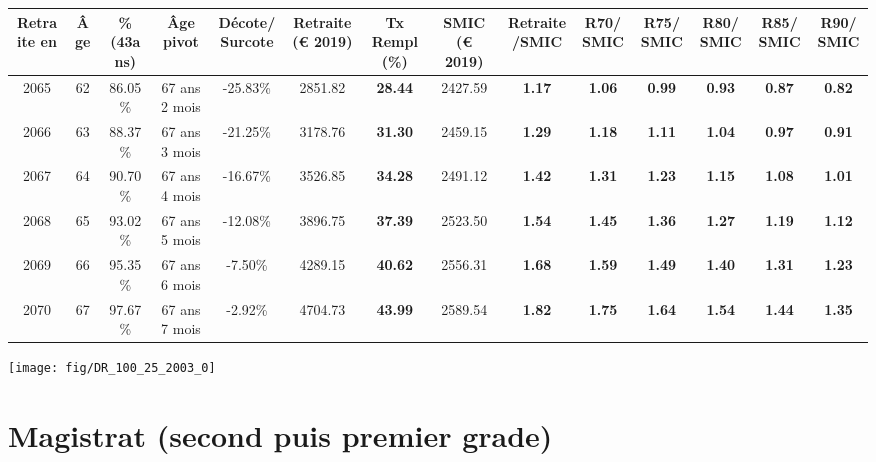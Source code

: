 \begin{adjustbox}{max width=\textwidth} 
\begin{tabular}[htb]{|c|c||c|c|c||c|c||c|c||c|c|c|c|c|} 
\hline 
 Retraite en &  Âge &  \%(43ans) &  Âge pivot &  Décote/Surcote &  Retraite (\euro{} 2019) &  Tx Rempl(\%) &  SMIC (\euro{} 2019) &  Retraite/SMIC &  R70/SMIC &  R75/SMIC &  R80/SMIC &  R85/SMIC &  R90/SMIC \\ 
\hline \hline 
 2065 &  62 &  86.05\% &  67 ans 2 mois &  -25.83\% &  2851.82 &  {\bf 28.44} &  2427.59 &  {\bf 1.17} &  {\bf 1.06} &  {\bf {\color{red} 0.99}} &  {\bf {\color{red} 0.93}} &  {\bf {\color{red} 0.87}} &  {\bf {\color{red} 0.82}} \\ 
\hline 
 2066 &  63 &  88.37\% &  67 ans 3 mois &  -21.25\% &  3178.76 &  {\bf 31.30} &  2459.15 &  {\bf 1.29} &  {\bf 1.18} &  {\bf 1.11} &  {\bf 1.04} &  {\bf {\color{red} 0.97}} &  {\bf {\color{red} 0.91}} \\ 
\hline 
 2067 &  64 &  90.70\% &  67 ans 4 mois &  -16.67\% &  3526.85 &  {\bf 34.28} &  2491.12 &  {\bf 1.42} &  {\bf 1.31} &  {\bf 1.23} &  {\bf 1.15} &  {\bf 1.08} &  {\bf 1.01} \\ 
\hline 
 2068 &  65 &  93.02\% &  67 ans 5 mois &  -12.08\% &  3896.75 &  {\bf 37.39} &  2523.50 &  {\bf 1.54} &  {\bf 1.45} &  {\bf 1.36} &  {\bf 1.27} &  {\bf 1.19} &  {\bf 1.12} \\ 
\hline 
 2069 &  66 &  95.35\% &  67 ans 6 mois &  -7.50\% &  4289.15 &  {\bf 40.62} &  2556.31 &  {\bf 1.68} &  {\bf 1.59} &  {\bf 1.49} &  {\bf 1.40} &  {\bf 1.31} &  {\bf 1.23} \\ 
\hline 
 2070 &  67 &  97.67\% &  67 ans 7 mois &  -2.92\% &  4704.73 &  {\bf 43.99} &  2589.54 &  {\bf 1.82} &  {\bf 1.75} &  {\bf 1.64} &  {\bf 1.54} &  {\bf 1.44} &  {\bf 1.35} \\ 
\hline 
\hline 
\end{tabular} 
\end{adjustbox} 
 
 \vspace{0.1cm} 

 {\hspace{-2.2cm}\texttt{[image: fig/DR\_100\_25\_2003\_0]}} 

\newpage 
 
\chapter{Magistrat (second puis premier grade)} 

